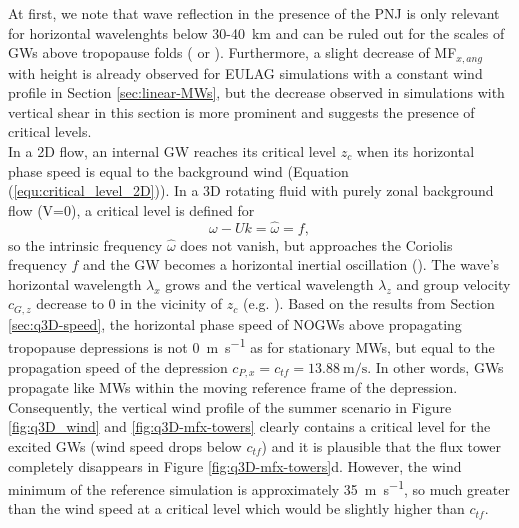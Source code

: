 At first, we note that wave reflection in the presence of the PNJ is only relevant for horizontal wavelenghts below 30-\SI{40}{\kilo\meter} and can be ruled out for the scales of GWs above tropopause folds (\cite[]{gill_atmosphere-ocean_1982} or \cite[]{mixa_nonlinear_2021}). Furthermore, a slight decrease of MF$_{x,ang}$ with height is already observed for EULAG simulations with a constant wind profile in Section \ref{sec:linear-MWs}, but the decrease observed in simulations with vertical shear in this section is more prominent and suggests the presence of critical levels.\\
In a 2D flow, an internal GW reaches its critical level $z_c$ when its horizontal phase speed is equal to the background wind (Equation (\ref{equ:critical_level_2D})). In a 3D rotating fluid with purely zonal background flow (V=0), a critical level is defined for 
\begin{equation}
    \omega - Uk = \hat{\omega} = f,
    \label{equ:critical_level}
\end{equation}
so the intrinsic frequency $\hat{\omega}$ does not vanish, but approaches the Coriolis frequency $f$ and the GW becomes a horizontal inertial oscillation (\cite{jones_propagation_1967}). The wave's horizontal wavelength $\lambda_x$ grows and the vertical wavelength $\lambda_z$ and group velocity $c_{G,z}$ decrease to 0 in the vicinity of $z_c$ (e.g. \cite[]{lin_mesoscale_2007}). Based on the results from Section \ref{sec:q3D-speed}, the horizontal phase speed of NOGWs above propagating tropopause depressions is not \SI{0}{\meter\per\second} as for stationary MWs, but equal to the propagation speed of the depression $c_{P,x}=c_{tf}=\SI{13.88}{\meter\per\second}$. In other words, GWs propagate like MWs within the moving reference frame of the depression. Consequently, the vertical wind profile of the summer scenario in Figure \ref{fig:q3D_wind} and \ref{fig:q3D-mfx-towers} clearly contains a critical level for the excited GWs (wind speed drops below $c_{tf}$) and it is plausible that the flux tower completely disappears in Figure \ref{fig:q3D-mfx-towers}d. However, the wind minimum of the reference simulation is approximately \SI{35}{\meter\per\second}, so much greater than the wind speed at a critical level which would be slightly higher than $c_{tf}$.\\
